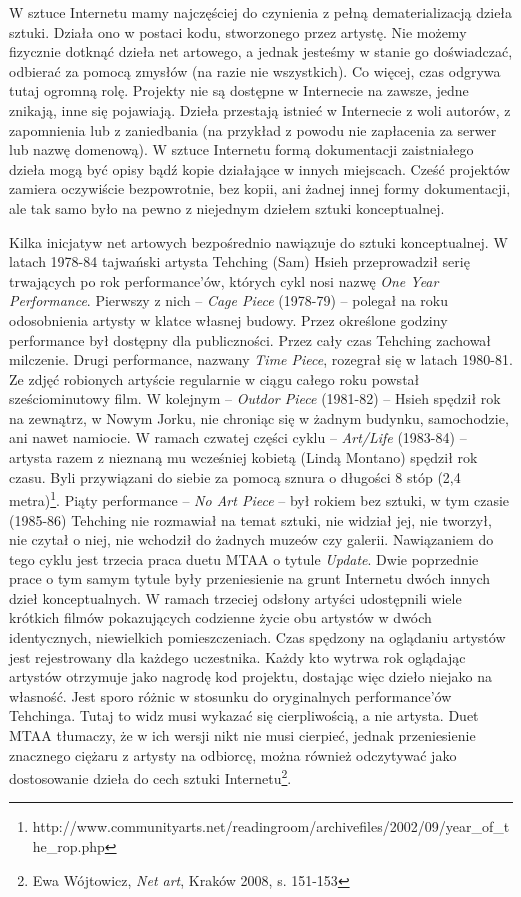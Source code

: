 \documentclass[a4paper,12pt,twoside]{article}
\begin{document}
W sztuce Internetu mamy najczęściej do czynienia z pełną dematerializacją
dzieła sztuki. Działa ono w postaci kodu, stworzonego przez artystę.
Nie możemy fizycznie dotknąć dzieła net artowego, a jednak jesteśmy w stanie
go doświadczać, odbierać za pomocą zmysłów (na razie nie wszystkich).
Co więcej, czas odgrywa tutaj ogromną rolę. Projekty nie są dostępne
w Internecie na zawsze, jedne znikają, inne się pojawiają. Dzieła przestają
istnieć w Internecie z woli autorów, z zapomnienia lub z zaniedbania (na
przykład z powodu nie zapłacenia za serwer lub nazwę domenową). W sztuce
Internetu formą dokumentacji zaistniałego dzieła mogą być opisy bądź kopie
działające w innych miejscach. Cześć projektów zamiera oczywiście bezpowrotnie,
bez kopii, ani żadnej innej formy dokumentacji, ale tak samo było na pewno
z niejednym dziełem sztuki konceptualnej.

Kilka inicjatyw net artowych bezpośrednio nawiązuje do sztuki konceptualnej.
W latach 1978-84 tajwański artysta
Tehching (Sam) Hsieh przeprowadził serię trwających po rok
performance'ów, których cykl nosi nazwę \textit{One Year Performance}.
Pierwszy z nich -- \textit{Cage Piece} (1978-79) -- polegał na roku
odosobnienia artysty w klatce własnej budowy. Przez określone godziny
performance był dostępny dla publiczności. Przez cały czas Tehching zachował
milczenie. Drugi performance, nazwany \textit{Time Piece}, rozegrał się
w latach 1980-81. Ze zdjęć robionych artyście regularnie w ciągu całego roku
powstał sześciominutowy film. W kolejnym -- \textit{Outdor Piece} (1981-82) --
Hsieh spędził rok na zewnątrz, w Nowym Jorku, nie chroniąc się w żadnym
budynku, samochodzie, ani nawet namiocie. W ramach czwatej części cyklu --
\textit{Art/Life} (1983-84) -- artysta razem z nieznaną mu wcześniej kobietą
(Lindą Montano) spędził rok czasu. Byli przywiązani do siebie za pomocą
sznura o długości 8 stóp
(2,4 metra)\footnote{ http://www.communityarts.net/readingroom/archivefiles/2002/09/year\_of\_the\_rop.php}.
Piąty performance -- \textit{No Art Piece} -- był rokiem bez sztuki,
w tym czasie (1985-86) Tehching nie rozmawiał na temat sztuki, nie widział jej,
nie tworzył, nie czytał o niej, nie wchodził do żadnych muzeów czy galerii.
Nawiązaniem do tego cyklu jest trzecia praca duetu MTAA o tytule
\textit{Update}. Dwie poprzednie prace o tym samym tytule były przeniesienie
na grunt Internetu dwóch innych dzieł konceptualnych. W ramach trzeciej
odsłony artyści udostępnili wiele krótkich filmów pokazujących
codzienne życie obu artystów w dwóch identycznych, niewielkich pomieszczeniach.
Czas spędzony na oglądaniu artystów jest rejestrowany dla każdego uczestnika.
Każdy kto wytrwa rok oglądając artystów otrzymuje jako nagrodę kod
projektu, dostając więc dzieło niejako na własność. Jest sporo różnic
w stosunku do oryginalnych performance'ów Tehchinga. Tutaj to widz musi
wykazać się cierpliwością, a nie artysta. Duet MTAA tłumaczy, że w ich wersji
nikt nie musi cierpieć, jednak przeniesienie znacznego ciężaru z artysty
na odbiorcę, można również odczytywać jako dostosowanie dzieła do cech
sztuki Internetu\footnote{ Ewa Wójtowicz, \textit{Net art}, Kraków 2008,
s. 151-153}.
\end{document}
